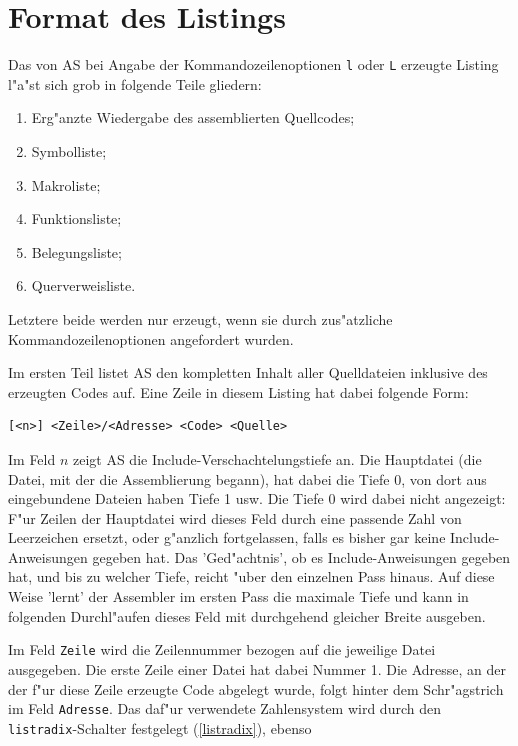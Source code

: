 \documentclass[12pt,a4paper,twoside]{report}
\newcommand{\tty}[1]{{\tt #1}}
\newcommand{\asname}{AS}
\begin{document}

\section{Format des Listings}
\label{SectListing}

Das von \asname{} bei Angabe der Kommandozeilenoptionen \tty{l} oder \tty{L}
erzeugte Listing l"a"st sich grob in folgende Teile gliedern:
\begin{enumerate}
\item{Erg"anzte Wiedergabe des assemblierten Quellcodes;}
\item{Symbolliste;}
\item{Makroliste;}
\item{Funktionsliste;}
\item{Belegungsliste;}
\item{Querverweisliste.}
\end{enumerate}
Letztere beide werden nur erzeugt, wenn sie durch zus"atzliche
Kommandozeilenoptionen angefordert wurden.
\par
Im ersten Teil listet \asname{} den kompletten Inhalt aller Quelldateien inklusive
des erzeugten Codes auf.  Eine Zeile in diesem Listing hat dabei folgende Form:
\begin{verbatim}
[<n>] <Zeile>/<Adresse> <Code> <Quelle>
\end{verbatim}
Im Feld $n$ zeigt \asname{} die Include-Verschachtelungstiefe an.  Die
Hauptdatei (die Datei, mit der die Assemblierung begann), hat dabei die
Tiefe 0, von dort aus eingebundene Dateien haben Tiefe 1 usw.  Die Tiefe
0 wird dabei nicht angezeigt: F"ur Zeilen der Hauptdatei wird dieses Feld
durch eine passende Zahl von Leerzeichen ersetzt, oder g"anzlich fortgelassen,
falls es bisher gar keine Include-Anweisungen gegeben hat.  Das 'Ged"achtnis',
ob es Include-Anweisungen gegeben hat, und bis zu welcher Tiefe, reicht
"uber den einzelnen Pass hinaus.  Auf diese Weise 'lernt' der Assembler im
ersten Pass die maximale Tiefe und kann in folgenden Durchl"aufen dieses
Feld mit durchgehend gleicher Breite ausgeben.
\par
Im Feld \tty{Zeile} wird die Zeilennummer bezogen auf die jeweilige Datei
ausgegeben.  Die erste Zeile einer Datei hat dabei Nummer 1.  Die Adresse,
an der der f"ur diese Zeile erzeugte Code abgelegt wurde, folgt hinter dem
Schr"agstrich im Feld \tty{Adresse}.  Das daf"ur verwendete Zahlensystem
wird durch den {\tt listradix}-Schalter festgelegt (\ref{listradix}), ebenso
\end{document}
